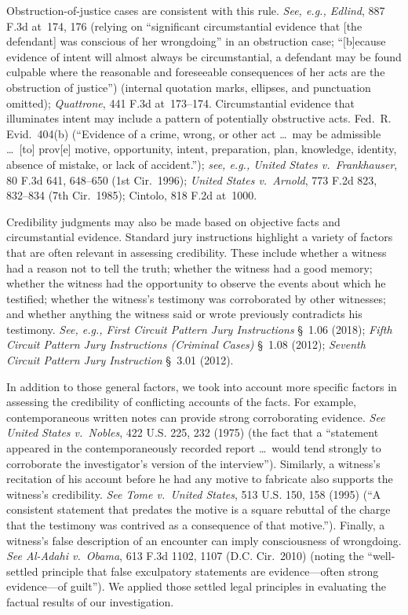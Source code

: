 Obstruction-of-justice cases are consistent with this rule.
\textit{See, e.g., Edlind}, 887 F.3d at~174, 176 (relying on ``significant circumstantial evidence that [the defendant] was conscious of her wrongdoing'' in an obstruction case; ``[b]ecause evidence of intent will almost always be circumstantial, a defendant may be found culpable where the reasonable and foreseeable consequences of her acts are the obstruction of justice'') (internal quotation marks, ellipses, and punctuation omitted);
\textit{Quattrone}, 441 F.3d at~173--174.
Circumstantial evidence that illuminates intent may include a pattern of potentially obstructive acts. Fed.~R. Evid.~404(b) (``Evidence of a crime, wrong, or other act \dots\ may be admissible \dots\ [to] prov[e] motive, opportunity, intent, preparation, plan, knowledge, identity, absence of mistake, or lack of accident.'');
\textit{see, e.g., United States v.\ Frankhauser}, 80 F.3d 641, 648--650 (1st Cir.~1996);
\textit{United States v.\ Arnold}, 773 F.2d 823, 832--834 (7th Cir.~1985);
Cintolo, 818 F.2d at~1000.

Credibility judgments may also be made based on objective facts and circumstantial evidence.
Standard jury instructions highlight a variety of factors that are often relevant in assessing credibility.
These include whether a witness had a reason not to tell the truth; whether the witness had a good memory;
whether the witness had the opportunity to observe the events about which he testified;
whether the witness's testimony was corroborated by other witnesses;
and whether anything the witness said or wrote previously contradicts his testimony.
\textit{See, e.g., First Circuit Pattern Jury Instructions} \S~1.06 (2018);
\textit{Fifth Circuit Pattern Jury Instructions (Criminal Cases)} \S~1.08 (2012);
\textit{Seventh Circuit Pattern Jury Instruction} \S~3.01 (2012).

In addition to those general factors, we took into account more specific factors in assessing the credibility of conflicting accounts of the facts.
For example, contemporaneous written notes can provide strong corroborating evidence.
\textit{See United States v.\ Nobles}, 422 U.S. 225, 232 (1975) (the fact that a ``statement appeared in the contemporaneously recorded report \dots\ would tend strongly to corroborate the investigator's version of the interview'').
Similarly, a witness's recitation of his account before he had any motive to fabricate also supports the witness's credibility.
\textit{See Tome v.\ United States}, 513 U.S. 150, 158 (1995) (``A consistent statement that predates the motive is a square rebuttal of the charge that the testimony was contrived as a consequence of that motive.'').
Finally, a witness's false description of an encounter can imply consciousness of wrongdoing.
\textit{See Al-Adahi v.\ Obama}, 613 F.3d 1102, 1107 (D.C. Cir.~2010) (noting the ``well-settled principle that false exculpatory statements are evidence---often strong evidence---of guilt'').
We applied those settled legal principles in evaluating the factual results of our investigation.
